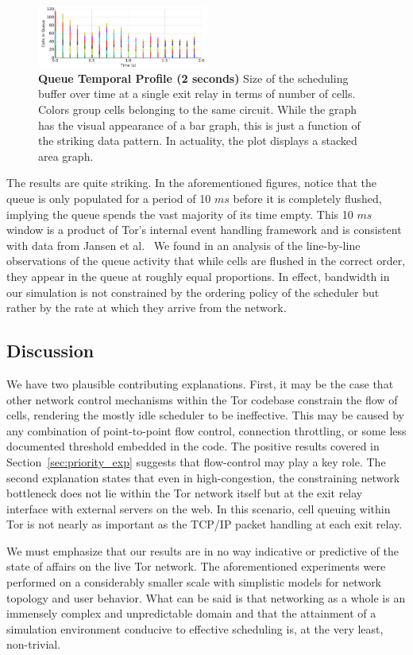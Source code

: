 \begin{figure} \centering
  \includegraphics[width=0.5\textwidth]{images/scheduling_close.png}
  \caption[Queue Temporal Profile (2 seconds)]{\textbf{Queue Temporal Profile
      (2 seconds)} Size of the scheduling buffer over time at a single exit
    relay in terms of number of cells. Colors group cells belonging to the same
    circuit. While the graph has the visual appearance of a bar graph, this is
    just a function of the striking data pattern. In actuality, the plot
    displays a stacked area graph.}
  \label{fig:scheduling_close}
\end{figure}


The results are quite striking. In the aforementioned figures, notice that the
queue is only populated for a period of 10 $ms$ before it is completely
flushed, implying the queue spends the vast majority of its time empty. This 10
$ms$ window is a product of Tor's internal event handling framework and is
consistent with data from Jansen et al.~\cite{jansen2017tor} We found in an
analysis of the line-by-line observations of the queue activity that while cells
are flushed in the correct order, they appear in the queue at roughly equal
proportions. In effect, bandwidth in our simulation is not constrained by the
ordering policy of the scheduler but rather by the rate at which they arrive
from the network.

\subsection{Discussion}

We have two plausible contributing explanations. First, it may be the case that
other network control mechanisms within the Tor codebase constrain the flow of
cells, rendering the mostly idle scheduler to be ineffective. This may be caused
by any combination of point-to-point flow control, connection throttling, or
some less documented threshold embedded in the code. The positive results
covered in Section~\ref{sec:priority_exp} suggests that flow-control may play a
key role. The second explanation states that even in high-congestion, the
constraining network bottleneck does not lie within the Tor network itself but
at the exit relay interface with external servers on the web. In this scenario,
cell queuing within Tor is not nearly as important as the TCP/IP packet handling
at each exit relay.

We must emphasize that our results are in no way indicative or predictive of the
state of affairs on the live Tor network. The aforementioned experiments were
performed on a considerably smaller scale with simplistic models for network
topology and user behavior. What can be said is that networking as a whole is an
immensely complex and unpredictable domain and that the attainment of a
simulation environment conducive to effective scheduling is, at the very least,
non-trivial.
